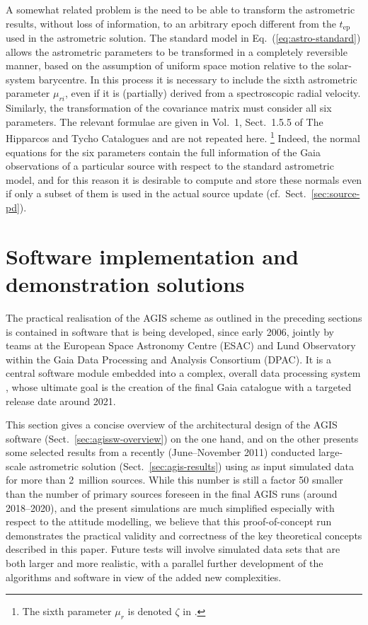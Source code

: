 \documentclass[structabstract]{aa}
\begin{document}
A somewhat related problem is the need to be able to transform the astrometric 
results, without loss of information, to an arbitrary epoch different from the 
$t_\text{ep}$ used in the astrometric solution. The standard model in 
Eq.~(\ref{eq:astro-standard}) allows the astrometric parameters to be transformed
in a completely reversible manner, based on the assumption of uniform space 
motion relative to the solar-system barycentre. In this process it is necessary to 
include the sixth astrometric parameter $\mu_{ri}$, even if it is (partially) derived 
from a spectroscopic radial velocity. Similarly, the transformation of the 
covariance matrix must consider all six parameters. The relevant
formulae are given in Vol.~1, Sect.~1.5.5 of The Hipparcos and Tycho Catalogues 
\citep{hip:catalogue} and are not repeated here.%
\footnote{The sixth parameter $\mu_r$ is denoted $\zeta$ in \citet{hip:catalogue}.}
Indeed, the normal equations for the six parameters contain the full information 
of the Gaia observations of a particular source with respect to the standard 
astrometric model, and for this reason it is desirable to compute and store
these normals even if only a subset of them is used in the actual source update 
(cf.\ Sect.~\ref{sec:source-pd}).


\section{Software implementation and demonstration solutions}\label{sec:impl}

The practical realisation of the AGIS scheme as outlined in the preceding
sections is contained in software that is being developed, since early 2006, jointly
by teams at the European Space Astronomy Centre (ESAC) and Lund Observatory
within the Gaia Data Processing and Analysis Consortium (DPAC). It is a central 
software module embedded into a complex, overall data processing
system \citep{WOM+2007}, whose ultimate goal is the creation of the
final Gaia catalogue with a targeted release date around 2021.

This section gives a concise overview of the architectural design
of the AGIS software (Sect.~\ref{sec:agissw-overview}) on the one hand,
and on the other presents some selected results from a recently (June--November 2011) 
conducted large-scale astrometric solution (Sect.~\ref{sec:agis-results}) using as
input simulated data for more than 2~million sources. 
While this number is still a factor 50 smaller than the number of primary
sources foreseen in the final AGIS runs (around 2018--2020), and the present
simulations are much simplified especially with respect to the attitude modelling,
we believe that this proof-of-concept run demonstrates the practical validity 
and correctness of the key theoretical concepts described in this paper. 
Future tests will involve simulated data sets that are both larger and more
realistic, with a parallel further development of the algorithms and software in 
view of the added new complexities.
\end{document}
